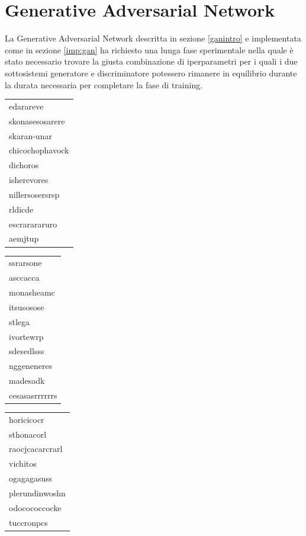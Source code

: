 \newpage
\section{Generative Adversarial Network}
\label{ris:gan}
La Generative Adversarial Network descritta in sezione \ref{ganintro} e implementata come in sezione \ref{imp:gan} ha richiesto una lunga fase sperimentale nella quale è stato necessario trovare la giusta combinazione di iperparametri per i quali i due sottosistemi generatore e discriminatore potessero rimanere in equilibrio durante la durata necessaria per completare la fase di training. 

\begin{table}[htbp]
\centering
	\begin{tabular}{l}
	\toprule
edarareve \\
skonasesosarere \\
skaran-unar \\
chicochophavock \\
dichoros \\
isherevores \\
nillersosersrsp \\
rldicde \\
escrarararuro \\
aemjtup \\
	\bottomrule
	\end{tabular}
	\begin{tabular}{l}
	\toprule
	ssrarsone \\
asccacca \\
monasheamc \\
itsusosose \\
stlega \\
ivortewrp \\
sdesedlsss \\
nggeneneres \\
madesadk \\
cesasasrrrrrrs \\
	\bottomrule
	\end{tabular}
	\begin{tabular}{l}
	\toprule
	horicicocr \\
sthonacorl \\
raocjcacarcrarl \\
vichitos \\
ogagagasuss \\
plerundinwoshn \\
odocococcocke \\
tuccronpcs \\

\end{tabular}
\end{table}

